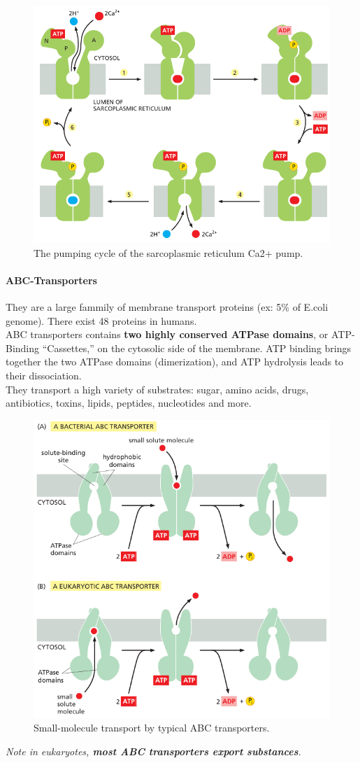 \documentclass[../main.tex]{subfiles}
\begin{document}
\begin{figure}[H]
	\centering
	\includegraphics[width = 0.7 \textwidth]{17}
	\caption{The pumping cycle of the sarcoplasmic reticulum Ca2+ pump. }
	\label{sarcoplasmic_reticulum_pump}
\end{figure}

\paragraph{ABC-Transporters}
They are a large fammily of membrane transport proteins (ex: 5\% of E.coli genome). There exist 48 proteins in humans. \\
ABC transporters contains \textbf{two highly conserved ATPase domains}, or ATP-Binding “Cassettes,” on the cytosolic side of the membrane. ATP binding brings together the two ATPase domains (dimerization), and ATP hydrolysis leads to their dissociation. \\
They transport a high variety of substrates: sugar, amino acids, drugs, antibiotics, toxins, lipids, peptides, nucleotides and more. 

\begin{figure}[H]
	\centering
	\includegraphics[width = 0.7 \textwidth]{18}
	\caption{Small-molecule transport by typical ABC transporters.}
	\label{ABCtransporter}
\end{figure}
\textit{Note in eukaryotes, \textbf{most ABC transporters export substances}.}
\end{document}
